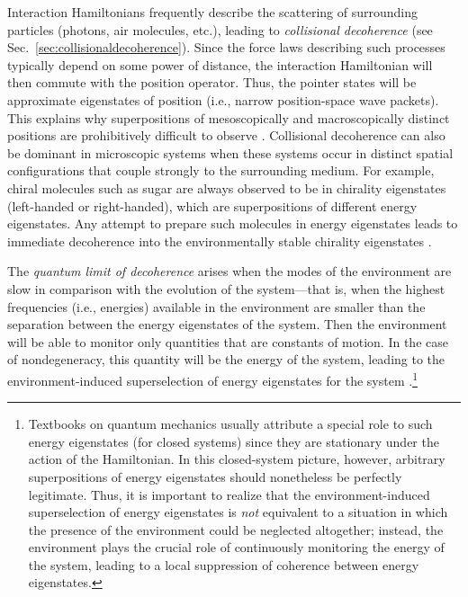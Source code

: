 \documentclass[aps,pra,reprint,amsmath,amssymb,showpacs,nofootinbib,floatfix,onecolumn,12pt]{revtex4-1}
\begin{document}
Interaction Hamiltonians frequently describe the scattering of surrounding particles (photons, air molecules, etc.), leading to \emph{collisional decoherence} (see Sec.~\ref{sec:collisionaldecoherence}). Since the force laws describing such processes typically depend on some power of distance, the interaction Hamiltonian will then commute with the position operator. Thus, the pointer states will be approximate eigenstates of position (i.e., narrow position-space wave packets). This explains why superpositions of mesoscopically and macroscopically distinct positions are prohibitively difficult to observe \cite{Zurek:1981:dd,Zurek:1982:tv,Joos:1985:iu,Zurek:1991:vv,Gallis:1990:un,Diosi:1995:um,Hornberger:2003:un,Hornberger:2006:tb,Hornberger:2008:ii,Busse:2009:aa,Busse:2010:aa}. Collisional decoherence can also be dominant in microscopic systems when these systems occur in distinct spatial configurations that couple strongly to the surrounding medium. For example, chiral molecules such as sugar are always observed to be in chirality eigenstates (left-handed or right-handed), which are superpositions of different energy eigenstates. Any attempt to prepare such molecules in energy eigenstates leads to immediate decoherence into the environmentally stable chirality eigenstates \cite{Harris:1981:rc,Zeh:1999:qr}.

The \emph{quantum limit of decoherence} \cite{Paz:1999:vv} arises when the modes of the environment are slow in comparison with the evolution of the system---that is, when the highest frequencies (i.e., energies) available in the environment are smaller than the separation between the energy eigenstates of the system. Then the environment will be able to monitor only quantities that are constants of motion. In the case of nondegeneracy, this quantity will be the energy of the system, leading to the environment-induced superselection of energy eigenstates for the system \cite{Paz:1999:vv}.\footnote{Textbooks on quantum mechanics usually attribute a special role to such energy eigenstates (for closed systems) since they are stationary under the action of the Hamiltonian. In this closed-system picture, however, arbitrary superpositions of energy eigenstates should nonetheless be perfectly legitimate. Thus, it is important to realize that the environment-induced superselection of energy eigenstates is \emph{not} equivalent to a situation in which the presence of the environment could be neglected altogether; instead, the environment plays the crucial role of continuously monitoring the energy of the system, leading to a local suppression of coherence between energy eigenstates.} 
\end{document}
